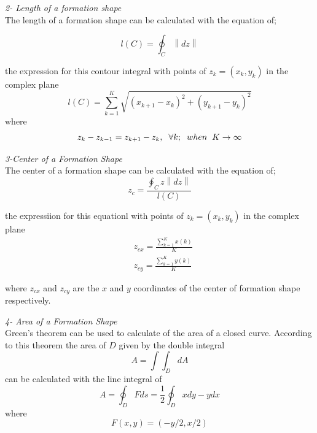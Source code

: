 \documentclass[twoside]{article}
\newcommand{\norm}[1]{\left\lVert#1\right\rVert}
\begin{document}
		\textit{ 	2- Length of a formation shape} \\ 
		
		
		The length of a formation shape can be calculated with the equation of;
		
		\begin{equation}
       l(C)= \oint_C \norm{dz}
		\end{equation}
		
		the expression for this contour integral with points of   $z_k = (x_k,y_k)$ in the complex plane
		\begin{equation}
l(C) = \sum_{k=1}^{K}\sqrt{(x_{k+1} - x_k)^2 + (y_{k+1} - y_k)^2}
		\end{equation}
				where
				\begin{equation}
				z_k - z_{k-1} = z_{k+1} - z_k, \hspace{0.2cm}  \forall k ;  \hspace{0.2cm} when  \hspace{0.2cm} K \to\infty
				\end{equation}
		
	
		\textit{ 	3-Center of a Formation Shape} \\ 	
	The center of a formation shape can be calculated with the equation of;
	\begin{equation}
 z_c = \frac{\oint_C z\norm{dz}}{l(C)}
	\end{equation}
		
				the expressiion for this equationl with points of  $z_k = (x_k,y_k)$ in the complex plane
				\begin{align*}
&z_{cx} = \frac{\sum_{k=1}^{K}x(k)}{K}  \\
&z_{cy} = \frac{\sum_{k=1}^{K}y(k)}{K}  
				\end{align*}
		
		where $z_{cx}$ and $z_{cy}$ are the $x$ and $y$ coordinates of the center of formation shape respectively.
		
	
		\textit{ 	4- Area of a Formation Shape} \\ 		
		Green's theorem can be used to calculate of the area of a closed curve. According to this theorem the area of $D$ given by the double integral
		\begin{equation}
 A = \int\int_D dA
		\end{equation}
		can be calculated with the line integral of
		\begin{equation}
 A = \oint_D F ds = \frac{1}{2} \oint_D xdy - ydx
		\end{equation}
where
\begin{equation}
F(x,y) = (-y/2,x/2)
\end{equation}
		
\end{document}
